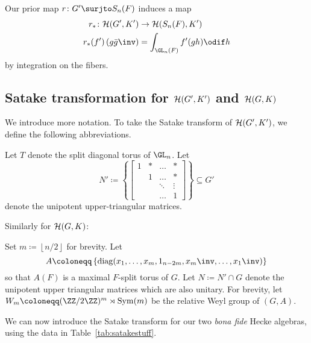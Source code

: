 Our prior map $r \colon G' \surjto S_n(F)$ induces a map
\begin{align*}
  r_\ast \colon \HH(G', K') &\to \HH(S_n(F), K') \\
  r_\ast(f')\left( g\bar{g}\inv \right) &= \int_{\GL_n(F)} f'(gh) \odif h
\end{align*}
by integration on the fibers.

\subsection{Satake transformation for $\mathcal H(G',K')$ and $\mathcal H(G,K)$}
We introduce more notation.
To take the Satake transform of $\mathcal H(G', K')$, we define the following abbreviations.
\begin{itemize}
  \ii Let $T$ denote the split diagonal torus of $\GL_n$.
  \ii Let
  \[ N' \coloneqq \left\{ \begin{bmatrix}
      1 & \ast & \dots & \ast \\
        & 1 & \dots & \ast \\
        &   & \ddots & \vdots \\
        &   & \dots & 1 \end{bmatrix}\right\} \subseteq G' \]
  denote the unipotent upper-triangular matrices.
\end{itemize}
Similarly for $\mathcal H(G, K)$:
\begin{itemize}
  \ii Set $m \coloneqq \left\lfloor n/2 \right\rfloor$ for brevity.
  \ii Let
  \[ A \coloneqq \left\{
    \diag(x_1, \dots, x_m, 1_{n-2m}, x_m\inv, \dots, x_1\inv) \right\} \]
  so that $A(F)$ is a maximal $F$-split torus of $G$.
  \ii Let $N \coloneqq N' \cap G$ denote the unipotent upper triangular matrices
  which are also unitary.
  \ii For brevity, let $W_m \coloneqq (\ZZ/2\ZZ)^m \rtimes \Sym(m)$
  be the relative Weyl group of $(G,A)$.
\end{itemize}

We can now introduce the Satake transform for our two
\emph{bona fide} Hecke algebras, using the data in Table~\ref{tab:satakestuff}.

